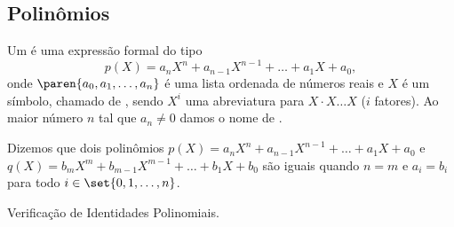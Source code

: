 \subsection{Polinômios}
\label{sec:polinomios}

\begin{definition}[Polinômio]
Um  é uma expressão formal do tipo
$$p(X) = a_n X^n+ a_{n-1} X^{n-1} + \dots + a_1X + a_0,$$
onde $\paren{a_0, a_1 , \dots , a_n}$ é uma lista ordenada de
números reais e $X$ é um símbolo, chamado de ,
sendo $X^i$ uma abreviatura para $X\cdot X  \dots  X$ ($i$ fatores).
Ao maior número $n$ tal que $a_n \neq 0$ damos o nome de .
\end{definition}

\begin{definition}
Dizemos que dois polinômios $p(X) = a_n X^n+ a_{n-1} X^{n-1} + \dots
+ a_1X + a_0$ e $q(X) = b_m X^m + b_{m-1} X^{m-1} + \dots + b_1X +
b_0$ são iguais quando $n=m$ e $a_i = b_i$ para todo $i \in \set{0,
1, \dots , n}$.
\end{definition}

\begin{onlineact}
    {Verificação de Identidades Polinomiais}.
\end{onlineact}